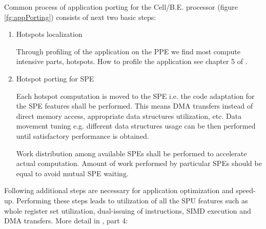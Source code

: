 Common process of application porting for the \mbox{Cell/B.E.} processor (figure \ref{fg:appPorting}) consists of next two basic steps:
\begin{enumerate}
\item Hotspots localization
\par
Through profiling of the application on the PPE we find most compute intensive parts, hotspots.
How to profile the application see chapter 5 of \cite{programmersGuide}.

\item Hotspot porting for SPE
\par
Each hotspot computation is moved to the SPE i.e. the code adaptation for the SPE features shall be performed.
This means DMA transfers instead of direct memory access, appropriate data structures utilization, etc.
Data movement tuning e.g. different data structures usage can be then performed until satisfactory performance is obtained.

\par
Work distribution among available SPEs shall be performed to accelerate actual computation.
Amount of work performed by particular SPEs should be equal to avoid mutual SPE waiting.
\end{enumerate}

\par
Following additional steps are necessary for application optimization and speed-up.
Performing these steps leads to utilization of all the SPU features such as whole register set utilization, dual-issuing of instructions, SIMD execution and DMA transfers.
More detail in \cite{writingPerfApps}, part 4:

